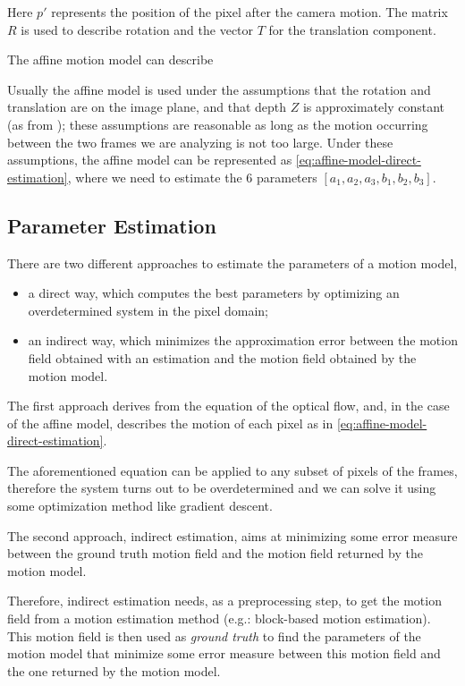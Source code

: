 

Here $p'$ represents the position of the pixel after the camera motion. The matrix $R$ is used to describe rotation and the vector $T$ for the translation component.

The affine motion model can describe

Usually the affine model is used under the assumptions that the rotation and translation are on the image plane, and that depth $Z$ is approximately constant (as from \cite{WangBook}); these assumptions are reasonable as long as the motion occurring between the two frames we are analyzing is not too large.
Under these assumptions, the affine model can be represented as \cref{eq:affine-model-direct-estimation}, where we need to estimate the 6 parameters $[a_1, a_2, a_3, b_1, b_2, b_3 ]$.



\subsection{Parameter Estimation}
There are two different approaches to estimate the parameters of a motion model,
\begin{itemize}
    \item a direct way, which computes the best parameters by optimizing an overdetermined system in the pixel domain;
    \item an indirect way, which minimizes the approximation error between the motion field obtained with an estimation and the motion field obtained by the motion model.
\end{itemize}

The first approach derives from the equation of the optical flow, and, in the case of the affine model, describes the motion of each pixel as in \cref{eq:affine-model-direct-estimation}. 

The aforementioned equation can be applied to any subset of pixels of the frames, therefore the system turns out to be overdetermined and we can solve it using some optimization method like gradient descent.

The second approach, indirect estimation, aims at minimizing some error measure between the ground truth motion field and the motion field returned by the motion model.

Therefore, indirect estimation needs, as a preprocessing step, to get the motion field from a motion estimation method (e.g.: block-based motion estimation). This motion field is then used as \textit{ground truth} to find the parameters of the motion model that minimize some error measure between this motion field and the one returned by the motion model.

